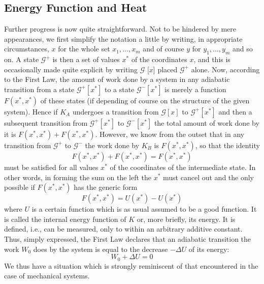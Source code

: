 \documentclass{article}
\theoremstyle{definition}
\begin{document}
\subsection{Energy Function and Heat}
Further progress is now quite straightforward. Not to be hindered by mere appearances, we first simplify the notation a little by writing, in appropriate circumstances, \(x\) for the whole set \(x_1, \ldots, x_m\) and of course \(y\) for \(y_1, \ldots, y_m\) and so on. A state \(\mathcal{G}^+\) is then a set of values \(x^*\) of the coordinates \(x\), and this is occasionally made quite explicit by writing \(\mathcal{G}\) [\(x\)] placed \(\mathcal{G}^+\) alone. Now, according to the First Law, the amount of work done by a system in any adiabatic transition from a state \(\mathcal{G}^+[x^*]\) to a state \(\mathcal{G}^-[x^*]\) is merely a function \(F(x^*, x^*)\) of these states (if depending of course on the structure of the given system). Hence if \(K_A\) undergoes a transition from \(\mathcal{G}[x]\) to \(\mathcal{G}^+[x^*]\) and then a subsequent transition from \(\mathcal{G}^+[x^*]\) to \(\mathcal{G}^-[x^*]\) the total amount of work done by it is \(F(x^*, x^*) + F(x^*, x^*)\). However, we know from the outset that in any transition from \(\mathcal{G}^+\) to \(\mathcal{G}^-\) the work done by \(K_B\) is \(F(x^*, x^*)\), so that the identity
\[F(x^*, x^*) + F(x^*, x^*) = F(x^*, x^*) \]
must be satisfied for all values \(x^*\) of the coordinates of the intermediate state. In other words, in forming the sum on the left the \(x^*\) must cancel out and the only possible if \(F(x^*, x^*)\) has the generic form
\[F(x^*, x^*) = U(x^*) - U(x^*) \]
where \(U\) is a certain function which is as usual assumed to be a good function. It is called the internal energy function of \(K\) or, more briefly, its energy. It is defined, i.e., can be measured, only to within an arbitrary additive constant. Thus, simply expressed, the First Law declares that an adiabatic transition the work \(W_0\) does by the system is equal to the decrease \(-\Delta U\) of its energy:
\[W_0 + \Delta U = 0 \]
We thus have a situation which is strongly reminiscent of that encountered in the case of mechanical systems.
\end{document}

